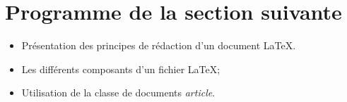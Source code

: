 \section{Programme de la section suivante}

\vfill
\begin{itemize}
\item Présentation des principes de rédaction d'un document \LaTeX.
\item Les différents composants d'un fichier \LaTeX;
\item Utilisation de la classe de documents \emph{article}.
\end{itemize}

\vfill







